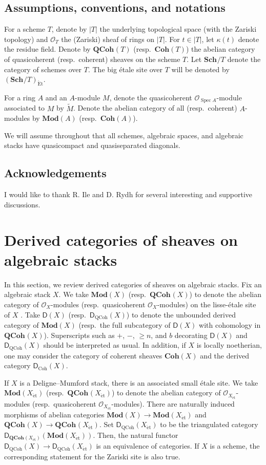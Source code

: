 \documentclass{amsart}
\theoremstyle{plain}
\theoremstyle{definition}
\theoremstyle{remark}
\numberwithin{equation}{section}
\newcommand{\Orb}{\mathcal{O}}
\DeclareMathOperator{\spec}{Spec}
\newcommand{\COH}[1]{\mathbf{Coh}({#1})}
\newcommand{\QCOHB}{\mathbf{QCoh}}
\newcommand{\QCOH}[2][]{\QCOHB^{#1}({#2})}
\newcommand{\et}{\mathrm{\acute{e}t}}
\newcommand{\Et}{\mathrm{\acute{E}t}}
\newcommand{\MOD}[1]{\mathbf{Mod}({#1})}
\newcommand{\DCAT}{\mathsf{D}}
\newcommand{\Sch}{\mathbf{Sch}}
\newcommand{\SCH}[2][]{\Sch^{#1}/{#2}}
\newcommand{\DQCOH}{\DCAT_{\mathrm{QCoh}}}
\newcommand{\DCOH}{\DCAT_{\mathrm{Coh}}}
\begin{document}
\subsection*{Assumptions, conventions, and notations}
For a scheme $T$, denote by $|T|$ the underlying topological space
(with the Zariski topology) and $\Orb_T$ the (Zariski) sheaf of rings
on $|T|$. For $t\in |T|$, let $\kappa(t)$ denote the residue field.
Denote by $\QCOH{T}$ (resp.\ $\COH{T}$) the abelian category of
quasicoherent (resp.\ coherent) sheaves on the scheme $T$. Let
$\SCH{T}$ denote the category of schemes over $T$. The big \'etale
site over $T$ will be denoted by $(\SCH{T})_\Et$.  

For a ring $A$ and an $A$-module $M$, denote the quasicoherent
$\Orb_{\spec A}$-module associated to $M$ by $\widetilde{M}$. Denote
the abelian category of all (resp.\ coherent) $A$-modules by $\MOD{A}$
(resp.\ $\COH{A}$). 

We will assume throughout that all schemes, algebraic spaces, and
algebraic stacks have quasicompact and quasiseparated diagonals. 
\subsection*{Acknowledgements}  
I would like to thank R. Ile and D. Rydh for several interesting and
supportive discussions.  
\tableofcontents
\section{Derived categories of sheaves on algebraic stacks}
In this section, we review derived categories of sheaves on algebraic
stacks. Fix an algebraic stack $X$. We take $\MOD{X}$ (resp.~$\QCOH{X}$) to
denote the abelian category of $\Orb_X$-modules (resp.~quasicoherent
$\Orb_X$-modules) on the lisse-\'etale site of $X$
\cite[12.1]{MR1771927}. Take $\DCAT(X)$ (resp.~$\DQCOH(X)$) to denote
the unbounded derived category of $\MOD{X}$ (resp.~the full
subcategory of $\DCAT(X)$ with cohomology in $\QCOH{X}$). Superscripts
such as $+$, $-$, $\geq n$, and $b$ decorating $\DCAT(X)$ and
$\DQCOH(X)$ should be interpreted as usual. In addition, if $X$ is
locally noetherian, one may consider the category of coherent sheaves
$\COH{X}$ and the derived category $\DCOH(X)$. 

If $X$ is a Deligne--Mumford stack, there is an
associated small \'etale site. We take $\MOD{X_{\et}}$
(resp.~$\QCOH{X_{\et}}$) to denote the abelian category of
$\Orb_{X_{\et}}$-modules (resp.~quasicoherent
$\Orb_{X_{\et}}$-modules). There are naturally induced morphisms of
abelian categories $\MOD{X} \to \MOD{X_{\et}}$ and $\QCOH{X} \to
\QCOH{X_{\et}}$. Set $\DQCOH(X_{\et})$ to be the triangulated category
$\DCAT_{\QCOH{X_{\et}}}(\MOD{X_{\et}})$. Then, the natural functor
$\DQCOH(X) \to \DQCOH(X_{\et})$ is an equivalence of
categories. If $X$ is a scheme, the corresponding statement for the
Zariski site is also true.
\end{document}
